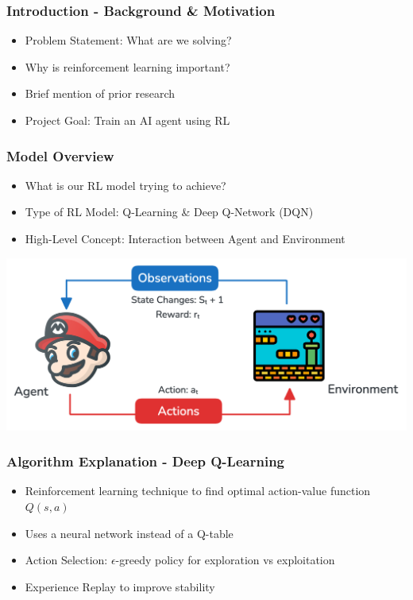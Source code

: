 \begin{frame}
    \frametitle{Introduction - Background \& Motivation}
    \begin{itemize}
        \item Problem Statement: What are we solving?
        \item Why is reinforcement learning important?
        \item Brief mention of prior research
        \item Project Goal: Train an AI agent using RL
    \end{itemize}
\end{frame}

\begin{frame}
    \frametitle{Model Overview}
    \begin{itemize}
        \item What is our RL model trying to achieve?
        \item Type of RL Model: Q-Learning \& Deep Q-Network (DQN)
        \item High-Level Concept: Interaction between Agent and Environment
    \end{itemize}
    \centering
    \includegraphics[scale=0.25]{rl_agent_env}
\end{frame}

\begin{frame}
    \frametitle{Algorithm Explanation - Deep Q-Learning}
    \begin{itemize}
        \item Reinforcement learning technique to find optimal action-value function \( Q(s,a) \)
        \item Uses a neural network instead of a Q-table
        \item Action Selection: $\epsilon$-greedy policy for exploration vs exploitation
        \item Experience Replay to improve stability
    \end{itemize}
    \centering
\end{frame}

